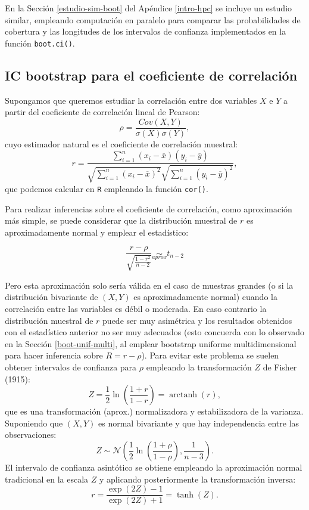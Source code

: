 \documentclass[
]{book}
\theoremstyle{break}
\theoremstyle{definition}
\theoremstyle{definition}
\theoremstyle{definition}
\theoremstyle{definition}
\theoremstyle{remark}
\begin{document}
En la Sección \ref{estudio-sim-boot} del Apéndice \ref{intro-hpc} se incluye un estudio similar, empleando computación en paralelo para comparar las probabilidades de cobertura y las longitudes de los intervalos de confianza implementados en la función \texttt{boot.ci()}.

\hypertarget{icboot-trans}{%
\subsection{IC bootstrap para el coeficiente de correlación}\label{icboot-trans}}

Supongamos que queremos estudiar la correlación entre dos variables \(X\) e \(Y\) a partir del coeficiente de correlación lineal de Pearson:
\[\rho =\frac{ Cov \left( X, Y \right) }
{ \sigma \left( X \right) \sigma \left( Y \right) },\]
cuyo estimador natural es el coeficiente de correlación muestral:
\[r=\frac{\sum_{i=1}^{n}(x_i-\overline{x})(y_i-\overline{y})}
{\sqrt{ \sum_{i=1}^{n}(x_i-\overline{x})^{2}} 
\sqrt{\sum_{i=1}^{n}(y_i-\overline{y})^{2}}},\]
que podemos calcular en \texttt{R} empleando la función \texttt{cor()}.

Para realizar inferencias sobre el coeficiente de correlación, como aproximación más simple, se puede considerar que la distribución muestral de \(r\) es aproximadamente normal y emplear el estadístico:

\begin{equation} 
\frac{r -\rho}{\sqrt{\frac{1 - r^2}{n - 2}}} \underset{aprox}{\sim } t_{n-2}
\label{eq:cor-t}
\end{equation}

Pero esta aproximación solo sería válida en el caso de muestras grandes (o si la distribución bivariante de \((X, Y)\) es aproximadamente normal) cuando la correlación entre las variables es débil o moderada.
En caso contrario la distribución muestral de \(r\) puede ser muy asimétrica y los resultados obtenidos con el estadístico anterior no ser muy adecuados (esto concuerda con lo observado en la Sección \ref{boot-unif-multi}, al emplear bootstrap uniforme multidimensional para hacer inferencia sobre \(R = r -\rho\)).
Para evitar este problema se suelen obtener intervalos de confianza para \(\rho\) empleando la transformación \(Z\) de Fisher (1915):
\[Z = \frac{1}{2}\ln \left( \frac{1+r}{1-r} \right) = \operatorname{arctanh}(r),\]
que es una transformación (aprox.) normalizadora y estabilizadora de la varianza.
Suponiendo que \((X, Y)\) es normal bivariante y que hay independencia entre las observaciones:
\[Z \sim \mathcal{N}\left( \frac{1}{2}\ln \left( \frac{1+\rho}{1-\rho} \right), \frac{1}{n-3} \right).\]
El intervalo de confianza asintótico se obtiene empleando la aproximación normal tradicional en la escala \(Z\) y aplicando posteriormente la transformación inversa:
\[r = \frac{\exp(2Z)-1}{\exp(2Z)+1} = \operatorname{tanh}(Z).\]
\end{document}
